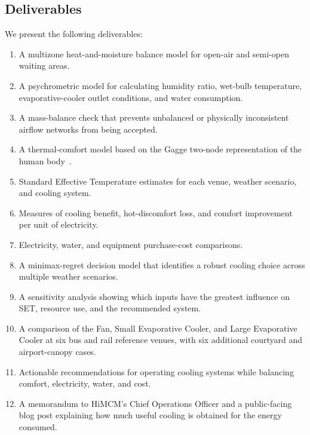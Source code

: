 \vspace{8 pt}

\subsection{Deliverables}

\vspace{8 pt}
  We present the following deliverables:

\begin{enumerate}

  \item A multizone heat-and-moisture balance model for open-air and semi-open waiting areas.
  \item A psychrometric model for calculating humidity ratio, wet-bulb temperature, evaporative-cooler outlet
     conditions, and water consumption.

  \item A mass-balance check that prevents unbalanced or physically inconsistent airflow networks from being
     accepted.

  \item A thermal-comfort model based on the Gagge two-node representation of the human body~\cite{comf_0112_set,cbe_two_node}.
  \item Standard Effective Temperature estimates for each venue, weather scenario, and cooling system.
  \item Measures of cooling benefit, hot-discomfort loss, and comfort improvement per unit of
     electricity.

  \item Electricity, water, and equipment purchase-cost comparisons.
  \item A minimax-regret decision model that identifies a robust cooling choice across multiple weather
     scenarios.

  \item A sensitivity analysis showing which inputs have the greatest influence on SET, resource use, and the
     recommended system.

  \item A comparison of the Fan, Small Evaporative Cooler, and Large Evaporative Cooler at six bus and rail
     reference venues, with six additional courtyard and airport-canopy cases.

  \item Actionable recommendations for operating cooling systems while balancing comfort, electricity, water,
     and cost.

  \item A memorandum to HiMCM’s Chief Operations Officer and a public-facing blog post explaining how much
     useful cooling is obtained for the energy consumed.


\end{enumerate}

